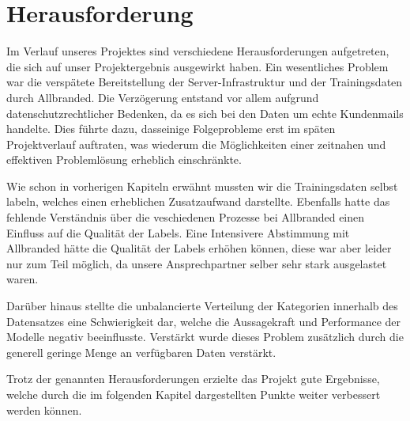 \chapter{Herausforderung}

Im Verlauf unseres Projektes sind verschiedene Herausforderungen aufgetreten, die sich auf unser
Projektergebnis ausgewirkt haben. Ein wesentliches Problem war die verspätete Bereitstellung 
der Server-Infrastruktur und der Trainingsdaten durch Allbranded. Die Verzögerung entstand vor 
allem aufgrund datenschutzrechtlicher Bedenken, da es sich bei den Daten um echte Kundenmails handelte. 
Dies führte dazu, dasseinige Folgeprobleme erst im späten Projektverlauf auftraten, 
was wiederum die Möglichkeiten einer zeitnahen und effektiven Problemlösung erheblich 
einschränkte. 

Wie schon in vorherigen Kapiteln erwähnt mussten wir die Trainingsdaten selbst labeln, welches einen
erheblichen Zusatzaufwand darstellte. Ebenfalls hatte das fehlende Verständnis über die veschiedenen
Prozesse bei Allbranded einen Einfluss auf die Qualität der Labels. Eine Intensivere Abstimmung mit
Allbranded hätte die Qualität der Labels erhöhen können, diese war aber leider nur
zum Teil möglich, da unsere Ansprechpartner selber sehr stark ausgelastet waren.  

Darüber hinaus stellte die unbalancierte Verteilung der Kategorien innerhalb des Datensatzes eine
Schwierigkeit dar, welche die Aussagekraft und Performance der Modelle negativ beeinflusste. Verstärkt
wurde dieses Problem zusätzlich durch die generell geringe Menge an verfügbaren Daten verstärkt.  

Trotz der genannten Herausforderungen erzielte das Projekt gute Ergebnisse, welche durch die im folgenden
Kapitel dargestellten Punkte weiter verbessert werden können. 

